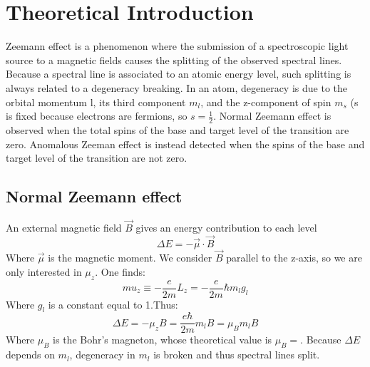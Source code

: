\documentclass[a4paper,12pt,abstracton]{scrartcl}
\begin{document}
\section{Theoretical Introduction}\label{sec: ThIntro}
Zeemann effect is a phenomenon where the submission of a spectroscopic light source to a magnetic fields causes the splitting of the observed spectral lines. Because a spectral line is associated to an atomic energy level, such splitting is always related to a degeneracy breaking. In an atom, degeneracy is due to the orbital momentum l, its third component $m_l$, and the z-component of spin $m_s$ (s is fixed  because electrons are fermions, so $s=\frac{1}{2}$.\newline
Normal Zeemann effect is observed when the total spins of the base and target level of the transition are zero.
Anomalous Zeeman effect is instead detected when the spins of the base and target level of the transition are not zero.
\subsection{Normal Zeemann effect}
An external magnetic field $\vec{B}$ gives an energy contribution to each level
\begin{equation}
\Delta E = - \vec{\mu} \cdot \vec{B}
\end{equation}
Where $\vec{\mu}$ is the magnetic moment. We consider $\vec{B}$ parallel to the z-axis, so we are only interested in $\mu_z$. One finds: 
\begin{equation}
mu_z \equiv -\frac{e}{2m}L_z = -\frac{e}{2m}\hbar m_lg_l
\end{equation}
Where $g_l$ is a constant equal to 1.Thus:
\begin{equation}
\Delta E = - \mu_z B = \frac{e \hbar}{2m} m_l B = \mu_B m_l B
\end{equation}
Where $\mu_B$ is the Bohr's magneton, whose theoretical value is
$\mu_B = $. Because $\Delta E$ depends on $m_l$, degeneracy in $m_l$ is broken and thus spectral lines split.
\end{document}

